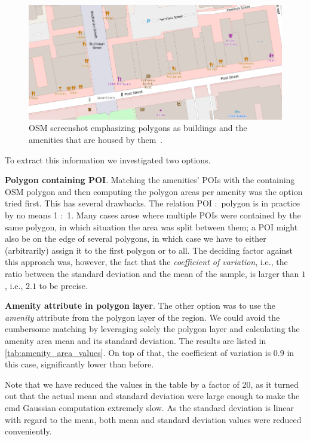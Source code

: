 	\begin{figure}[!ht]
		\centering
		\includegraphics[width=\textwidth]{graphics/amenity_polygons4.png}
		\caption{OSM screenshot emphasizing polygons as buildings and the amenities that are housed by them~\protect\cite{openstreetmap}.}
		\label{fig:amenity_polygons}
	\end{figure}
	
	To extract this information we investigated two options.
	\begin{romanlist}
		\item \textbf{Polygon containing POI}. 
		Matching the amenities' POIs with the containing OSM polygon and then computing the polygon areas per amenity was the option tried first. 
		This has several drawbacks. 
		The relation POI $\colon$ polygon is in practice by no means 1 $\colon$ 1.
		Many cases arose where multiple POIs were contained by the same polygon, in which situation the area was split between them; a POI might also be on the edge of several polygons, in which case we have to either (arbitrarily) assign it to the first polygon or to all. 
		The deciding factor against this approach was, however, the fact that the \textit{coefficient of variation}, i.e., the ratio between the standard deviation and the mean of the sample, is larger than $1$, i.e., $2.1$ to be precise.  
		
		\item \textbf{Amenity attribute in polygon layer}. The other option was to use the \textit{amenity} attribute from the polygon layer of the region. 
		We could avoid the cumbersome matching by leveraging solely the polygon layer and calculating the amenity area mean and its standard deviation. The results are listed in \cref{tab:amenity_area_values}. 
		On top of that, the coefficient of variation is $0.9$ in this case, significantly lower than before. 
		
		Note that we have reduced the values in the table by a factor of 20, as it turned out that the actual mean and standard deviation were large enough to make the emd Gaussian computation extremely slow. As the standard deviation is linear with regard to the mean, both mean and standard deviation values were reduced conveniently. 
		
	\end{romanlist}
	
